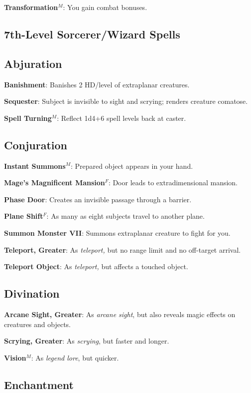 \textbf{Transformation}\(^{M}\): You gain combat bonuses.

\subsection{7th-Level Sorcerer/Wizard Spells}


\subsection{Abjuration}


\textbf{Banishment}: Banishes 2 HD/level of extraplanar creatures.

\textbf{Sequester}: Subject is invisible to sight and scrying; renders creature comatose.

\textbf{Spell Turning}\(^{M}\): Reflect 1d4+6 spell levels back at caster.

\subsection{Conjuration}


\textbf{Instant Summons}\(^{M}\): Prepared object appears in your hand.

\textbf{Mage's Magnificent Mansion}\(^{F}\): Door leads to extradimensional mansion.

\textbf{Phase Door}: Creates an invisible passage through a barrier.

\textbf{Plane Shift}\(^{F}\): As many as eight subjects travel to another plane.

\textbf{Summon Monster VII}: Summons extraplanar creature to fight for you.

\textbf{Teleport, Greater}: As \textit{teleport, }but no range limit and no off-target arrival.

\textbf{Teleport Object}: As \textit{teleport, }but affects a touched object.

\subsection{Divination}


\textbf{Arcane Sight, Greater}: As \textit{arcane sight}, but also reveals magic effects on creatures and objects.

\textbf{Scrying, Greater}: As \textit{scrying}, but faster and longer.

\textbf{Vision}\(^{M}\): As \textit{legend lore}, but quicker.

\subsection{Enchantment}


